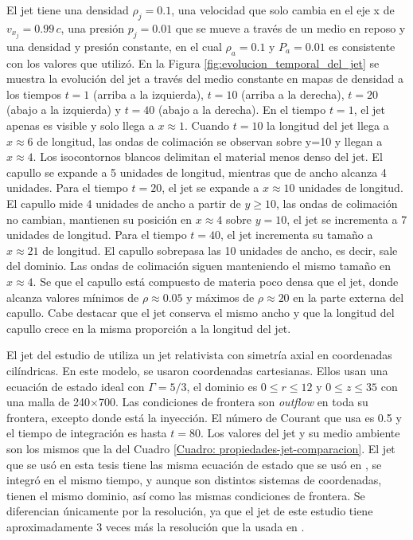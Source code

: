 \documentclass[12pt,a4paper]{book}
\begin{document}
El jet tiene una densidad $\rho_j = 0.1$, una velocidad que solo cambia en el eje x de $v_{x_{j}} = 0.99 \, c$, una presión $p_j = 0.01$ que se mueve a través de un medio en reposo y una densidad y presión constante, en el cual 
$\rho_a = 0.1 $ y $P_a = 0.01$ es consistente con los valores que \citet{MB-HLLC-I} utilizó. 
En la Figura \ref{fig:evolucion_temporal_del_jet} se muestra la evolución del jet a 
través del medio constante en mapas de densidad a los tiempos $t = 1$ (arriba a la izquierda), $t = 10$ (arriba a la derecha), $t = 20$ (abajo a la izquierda) y $t = 40$ (abajo a la derecha).
En el tiempo $t = 1$, el jet apenas es visible y solo llega a $x \approx 1$. 
Cuando $t = 10$ la longitud del jet llega  a $x \approx 6$ de longitud, las ondas de colimación se observan sobre y=10 y llegan a $x \approx 4$. Los isocontornos blancos delimitan el material menos denso del jet. 
El capullo se expande a 5 unidades de longitud, mientras que de ancho alcanza 4 unidades.
Para el tiempo $t = 20$, el jet se expande a 
$x \approx 10$ unidades de longitud. El capullo mide 4 unidades de ancho a partir de $y \geq 10$, 
las ondas de colimación no cambian, mantienen su posición en $x \approx 4$ sobre $y = 10$, el jet se incrementa a 7 unidades de longitud. Para el tiempo $t = 40$, el jet incrementa su tamaño a 
$x \approx 21$ de longitud. 
El capullo sobrepasa las 10 unidades de ancho, es decir, sale del dominio. Las ondas de colimación siguen manteniendo el mismo tamaño en $x \approx 4$. 
Se que el capullo está compuesto de materia poco densa que el jet, donde alcanza valores mínimos de $\rho \approx 0.05 $ y máximos de $\rho  \approx 20$ en la
parte externa del capullo. Cabe destacar que el jet conserva el mismo ancho y que la longitud del capullo crece 
en la misma proporción a la longitud del jet.

El jet del estudio de  \citet{MB-HLLC-I} utiliza un jet relativista con simetría axial en 
coordenadas cilíndricas. En este modelo, se usaron coordenadas cartesianas. 
Ellos usan una ecuación de estado ideal con $\Gamma = 5/3$, el dominio es 
$0 \leqslant r \leqslant 12$ y $0 \leqslant z \leqslant 35$ con una malla de 240$\times$700. Las condiciones de
frontera son \emph{outflow} en toda su frontera, excepto donde está la inyección. El número de Courant que
usa es 0.5 y el tiempo de integración es hasta $t = 80$. Los valores del jet y su medio ambiente son los
mismos que la del Cuadro \ref{Cuadro: propiedades-jet-comparacion}. El jet que se usó en esta tesis tiene las
misma ecuación de estado que se usó en \citet{MB-HLLC-I}, se integró en el mismo tiempo, y aunque son distintos sistemas de coordenadas, tienen el mismo dominio, así como las mismas condiciones de frontera. 
Se diferencian únicamente por la resolución, ya que el jet de este estudio tiene aproximadamente 3 veces más la resolución que la usada en \citet{MB-HLLC-I}.
\end{document}
